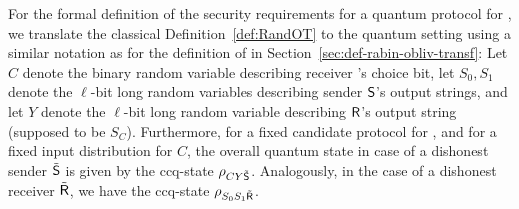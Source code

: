 
For the formal definition of the security requirements for a quantum
protocol for \RandlStringOT, we translate the classical
Definition~\ref{def:RandOT} to the quantum setting using a similar
notation as for the definition of \RabinOT in
Section~\ref{sec:def-rabin-obliv-transf}: Let $C$ denote the binary
random variable describing receiver \R's choice bit, let $S_0, S_1$
denote the $\ell$-bit long random variables describing sender $\S$'s
output strings, and let $Y$ denote the $\ell$-bit long random variable
describing $\R$'s output string (supposed to be $S_C$).  Furthermore,
for a fixed candidate protocol for \RandlStringOT, and for a fixed
input distribution for $C$, the overall quantum state in case of a
dishonest sender $\dS$ is given by the ccq-state $\rho_{C Y \dS}$.
Analogously, in the case of a dishonest receiver $\dR$, we have the
ccq-state $\rho_{S_0 S_1 \dR}$.


